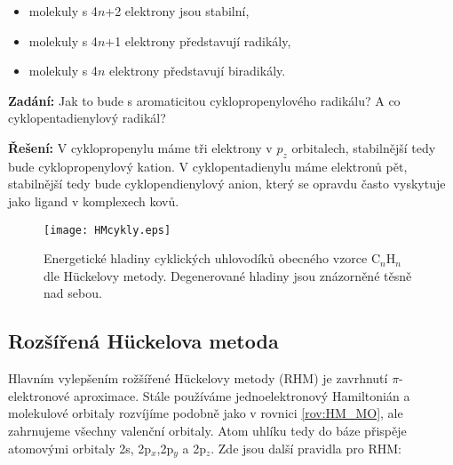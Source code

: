 \begin{itemize}
\item molekuly s 4$n$+2 elektrony jsou stabilní,
\item molekuly s 4$n$+1 elektrony představují radikály,
\item molekuly s 4$n$ elektrony představují biradikály.
\end{itemize}


\begin{priklad}
\textbf{Zadání:} Jak to bude s aromaticitou cyklopropenylového radikálu? A co cyklopentadienylový radikál?

\textbf{Řešení:} V cyklopropenylu máme tři elektrony v $p_z$ orbitalech, stabilnější tedy bude cyklopropenylový kation. V cyklopentadienylu máme elektronů pět, stabilnější tedy bude cyklopendienylový anion, který se opravdu často vyskytuje jako ligand v komplexech kovů.
\end{priklad}

\begin{figure}
\centering
\texttt{[image: HMcykly.eps]}
\caption[Energetické hladiny cyklických uhlovodíků]{Energetické hladiny cyklických uhlovodíků obecného vzorce C$_n$H$_n$ dle H\"{u}ckelovy metody. Degenerované hladiny jsou znázorněné těsně nad sebou.}
\label{obr:HMcykly}
\end{figure}
\bigskip



\subsection{Rozšířená H\"{u}ckelova metoda}

Hlavním vylepšením rožšířené H\"{u}ckelovy metody (RHM) je zavrhnutí $\pi$-elektronové aproximace.
Stále používáme jednoelektronový Hamiltonián a molekulové orbitaly rozvíjíme podobně jako v rovnici \eqref{rov:HM_MO}, ale zahrnujeme všechny valenční orbitaly. Atom uhlíku tedy do báze přispěje atomovými orbitaly 2s, 2p$_x$,2p$_y$ a 2p$_z$. 
Zde jsou další pravidla pro RHM:

